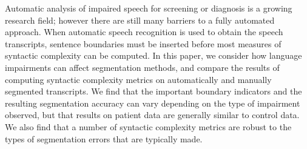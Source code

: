 Automatic analysis of impaired speech for screening or diagnosis is a growing research field; however there are still many barriers to a fully automated approach. When automatic speech recognition is used to obtain the speech transcripts, sentence boundaries must be inserted before most measures of syntactic complexity can be computed. In this paper, we consider how language impairments can affect segmentation methods, and compare the results of computing syntactic complexity metrics on automatically and manually segmented transcripts. We find that the important boundary indicators and the resulting segmentation accuracy can vary depending on the type of impairment observed, but that results on patient data are generally similar to control data. We also find that a number of syntactic complexity metrics are robust to the types of segmentation errors that are typically made.
